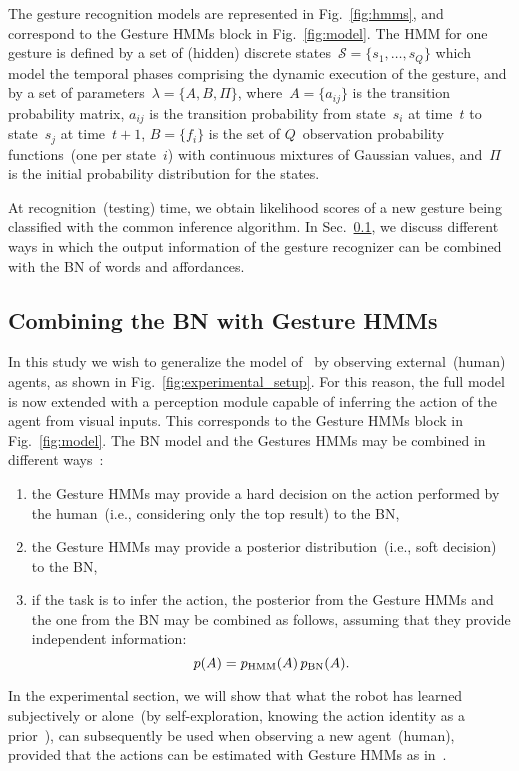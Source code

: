 The gesture recognition models are represented in Fig.~\ref{fig:hmms}, and correspond to the Gesture \acp{HMM} block in Fig.~\ref{fig:model}. The \ac{HMM} for one gesture is defined by a set of (hidden) discrete states~$\mathcal{S} = \{s_1, \dots, s_Q\}$ which model the temporal phases comprising the dynamic execution of the gesture, and by a set of parameters~$\lambda = \{ A, B, \Pi \}$, where~$A = \{ a_{ij} \}$ is the transition probability matrix, $a_{ij}$ is the transition probability from state~$s_i$ at time~$t$ to state~$s_j$ at time~$t+1$, $B = \{ f_i \}$ is the set of $Q$~observation probability functions~(one per state~$i$) with continuous mixtures of Gaussian values, and~$\Pi$ is the initial probability distribution for the states.

At recognition~(testing) time, we obtain likelihood scores of a new gesture being classified with the common \FB{} inference algorithm. In Sec.~\ref{sec:combination}, we discuss different ways in which the output information of the gesture recognizer can be combined with the \acl{BN} of words and affordances.

\subsection{Combining the \acs{BN} with Gesture \acsp{HMM}}
\label{sec:combination}

In this study we wish to generalize the model of~\cite{salvi:2012:smcb} by observing external~(human) agents, as shown in Fig.~\ref{fig:experimental_setup}. For this reason, the full model is now extended with a perception module capable of inferring the action of the agent from visual inputs. This corresponds to the Gesture \acp{HMM} block in Fig.~\ref{fig:model}. The \AffWords{} \acf{BN} model and the Gestures \acp{HMM} may be combined in different ways~\cite{pan:2006:ictai}:
\begin{enumerate}
\item the Gesture \acp{HMM} may provide a hard decision on the action performed by the human~(i.e., considering only the top result) to the \ac{BN},

\item the Gesture \acp{HMM} may provide a posterior distribution~(i.e., soft decision) to the \ac{BN},

\item if the task is to infer the action, the posterior from the Gesture \acp{HMM} and the one from the \ac{BN} may be combined as follows, assuming that they provide independent information:
\begin{equation*}
p(A) = p_{\text{HMM}}(A) \, p_{\text{BN}}(A).
\end{equation*}
\end{enumerate}

In the experimental section, we will show that what the robot has learned subjectively or alone~(by self-exploration, knowing the action identity as a prior~\cite{salvi:2012:smcb}), can subsequently be used when observing a new agent~(human), provided that the actions can be estimated with Gesture \acp{HMM} as in~\cite{saponaro:2013:crhri}.
